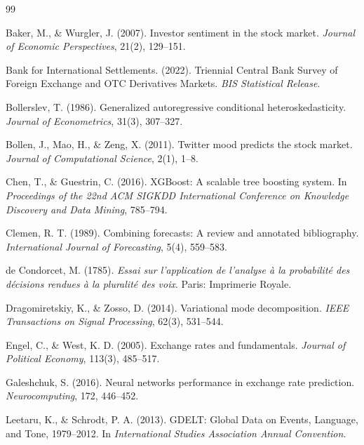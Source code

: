 \documentclass[11pt,a4paper]{article}
\begin{document}
\begin{thebibliography}{99}

Baker, M., \& Wurgler, J. (2007).
Investor sentiment in the stock market.
\textit{Journal of Economic Perspectives}, 21(2), 129--151.

Bank for International Settlements. (2022).
Triennial Central Bank Survey of Foreign Exchange and OTC Derivatives Markets.
\textit{BIS Statistical Release}.

Bollerslev, T. (1986).
Generalized autoregressive conditional heteroskedasticity.
\textit{Journal of Econometrics}, 31(3), 307--327.

Bollen, J., Mao, H., \& Zeng, X. (2011).
Twitter mood predicts the stock market.
\textit{Journal of Computational Science}, 2(1), 1--8.

Chen, T., \& Guestrin, C. (2016).
XGBoost: A scalable tree boosting system.
In \textit{Proceedings of the 22nd ACM SIGKDD International Conference on Knowledge Discovery and Data Mining}, 785--794.

Clemen, R. T. (1989).
Combining forecasts: A review and annotated bibliography.
\textit{International Journal of Forecasting}, 5(4), 559--583.

de Condorcet, M. (1785).
\textit{Essai sur l'application de l'analyse \`a la probabilit\'e des d\'ecisions rendues \`a la pluralit\'e des voix}.
Paris: Imprimerie Royale.

Dragomiretskiy, K., \& Zosso, D. (2014).
Variational mode decomposition.
\textit{IEEE Transactions on Signal Processing}, 62(3), 531--544.

Engel, C., \& West, K. D. (2005).
Exchange rates and fundamentals.
\textit{Journal of Political Economy}, 113(3), 485--517.

Galeshchuk, S. (2016).
Neural networks performance in exchange rate prediction.
\textit{Neurocomputing}, 172, 446--452.

Leetaru, K., \& Schrodt, P. A. (2013).
GDELT: Global Data on Events, Language, and Tone, 1979--2012.
In \textit{International Studies Association Annual Convention}.


\end{thebibliography}
\end{document}
